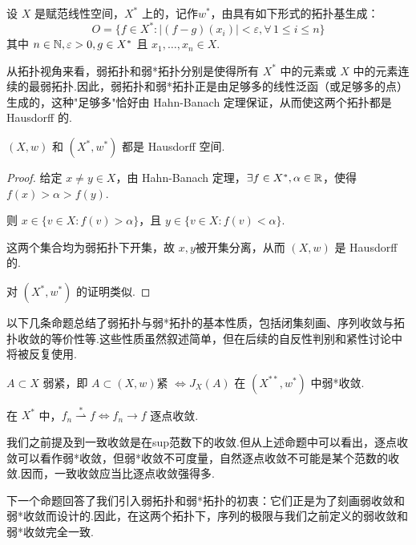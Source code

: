 \begin{definition}[弱*拓扑]
    设 $X$ 是赋范线性空间，$X^*$ 上的，记作$w^*$，由具有如下形式的拓扑基生成：
    \begin{equation*}
        O = \{f \in X^* : |(f - g)(x_i)| < \varepsilon, \forall\,1 \leq i \leq n\}
    \end{equation*}
    其中 $n \in \mathbb{N}, \varepsilon > 0, g \in X^*$ 且 $x_1, \dots, x_n \in X$.
\end{definition}

从拓扑视角来看，弱拓扑和弱*拓扑分别是使得所有 $X^*$ 中的元素或 $X$ 中的元素连续的最弱拓扑.因此，弱拓扑和弱*拓扑正是由足够多的线性泛函（或足够多的点）生成的，这种"足够多"恰好由 Hahn-Banach 定理保证，从而使这两个拓扑都是 Hausdorff 的.

\begin{proposition}
    $(X, w)$ 和 $(X^*, w^*)$ 都是 Hausdorff 空间.
\end{proposition}
\begin{proof}
    给定 $x \neq y \in X$，由 Hahn-Banach 定理，$\exists f \in X^*, \alpha \in \mathbb{R}$，使得 $f(x) > \alpha > f(y)$.\par
    则 $x \in \{v \in X : f(v) > \alpha\}$，且 $y \in \{v \in X : f(v) < \alpha\}$.\par
    这两个集合均为弱拓扑下开集，故 $x, y$被开集分离，从而 $(X, w)$ 是 Hausdorff 的.\par
    对 $(X^*, w^*)$ 的证明类似.
\end{proof}

以下几条命题总结了弱拓扑与弱*拓扑的基本性质，包括闭集刻画、序列收敛与拓扑收敛的等价性等.这些性质虽然叙述简单，但在后续的自反性判别和紧性讨论中将被反复使用.

\begin{proposition}
    $A \subset X$ 弱紧，即 $A\subset (X, w)$紧 $\iff J_X(A)$ 在 $(X^{**}, w^*)$ 中弱*收敛.
\end{proposition}

\begin{proposition}
    在 $X^*$ 中，$f_n \stackrel{*}{\rightharpoonup} f \iff f_n \to f$ 逐点收敛.
\end{proposition}

我们之前提及到一致收敛是在sup范数下的收敛.但从上述命题中可以看出，逐点收敛可以看作弱*收敛，但弱*收敛不可度量，自然逐点收敛不可能是某个范数的收敛.因而，一致收敛应当比逐点收敛强得多.\par

下一个命题回答了我们引入弱拓扑和弱*拓扑的初衷：它们正是为了刻画弱收敛和弱*收敛而设计的.因此，在这两个拓扑下，序列的极限与我们之前定义的弱收敛和弱*收敛完全一致.

